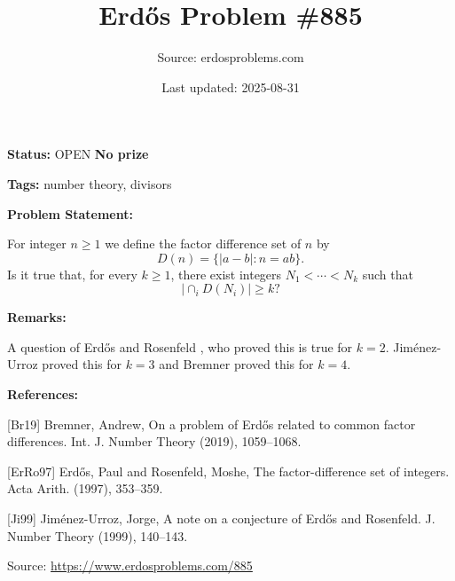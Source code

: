 \documentclass{article}
\title{Erd\H{o}s Problem \#885}
\date{Last updated: 2025-08-31}
\author{Source: erdosproblems.com}
\begin{document}
\maketitle

\noindent\textbf{Status:} OPEN \quad \textbf{No prize}

\noindent\textbf{Tags:} number theory, divisors

\medskip
\noindent\textbf{Problem Statement:}

For integer $n\geq 1$ we define the factor difference set of $n$ by\[D(n) = \{\lvert a-b\rvert : n=ab\}.\]Is it true that, for every $k\geq 1$, there exist integers $N_1<\cdots<N_k$ such that\[\lvert \cap_i D(N_i)\rvert \geq k?\]

\bigskip
\noindent\textbf{Remarks:}

A question of Erd\H{o}s and Rosenfeld \cite{ErRo97}, who proved this is true for $k=2$. Jim\'{e}nez-Urroz \cite{Ji99} proved this for $k=3$ and Bremner \cite{Br19} proved this for $k=4$.

\bigskip
\noindent\textbf{References:}

[Br19] Bremner, Andrew, On a problem of Erd\H{o}s related to common factor
differences. Int. J. Number Theory (2019), 1059--1068.
 
 [ErRo97] Erd\H{o}s, Paul and Rosenfeld, Moshe, The factor-difference set of integers. Acta Arith. (1997), 353--359.
 
 [Ji99] Jim\'{e}nez-Urroz, Jorge, A note on a conjecture of Erd\H{o}s and {R}osenfeld. J. Number Theory (1999), 140--143.

\bigskip
\noindent\small{Source: \url{https://www.erdosproblems.com/885}}
\end{document}
